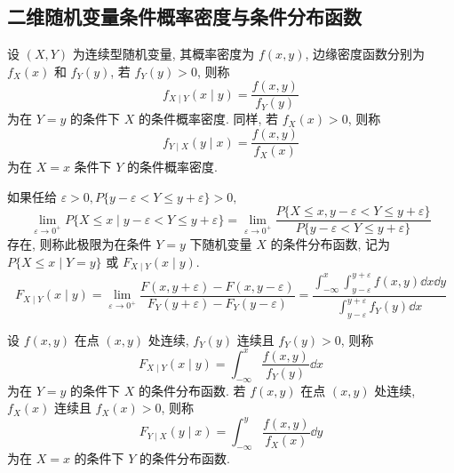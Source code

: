 \subsection{二维随机变量条件概率密度与条件分布函数}

\begin{definition}[二维随机变量条件概率密度]
    设 $ (X, Y) $ 为连续型随机变量, 其概率密度为 $ f(x, y) $, 边缘密度函数分别为 $ f_{X}(x) $ 和 $ f_{Y}(y) $, 
    若 $ f_{Y}(y)>0 $, 则称
    $$f_{X \mid Y}(x \mid y)=\frac{f(x, y)}{f_{Y}(y)}$$
    为在 $ Y=y $ 的条件下 $ X $ 的条件概率密度.
    同样, 若 $ f_{X}(x)>0 $, 则称
    $$f_{Y \mid X}(y \mid x)=\frac{f(x, y)}{f_{X}(x)}$$
    为在 $ X=x $ 条件下 $ Y $ 的条件概率密度.
\end{definition}

\begin{definition}[二维随机变量条件分布函数 A]
    如果任给 $ \varepsilon>0, P\{y-\varepsilon<Y \leqslant y+\varepsilon\}>0 ,$
    $$\lim _{\varepsilon \rightarrow 0^{+}} P\{X \leqslant x \mid y-\varepsilon<Y \leqslant y+\varepsilon\}=\lim _{\varepsilon \rightarrow 0^{+}} \frac{P\{X \leqslant x, y-\varepsilon<Y \leqslant y+\varepsilon\}}{P\{y-\varepsilon<Y \leqslant y+\varepsilon\}}$$
    存在, 则称此极限为在条件 $ Y=y $ 下随机变量 $ X $ 的条件分布函数, 记为 $ P\{X \leqslant x \mid Y=y\} $ 或 $ F_{X \mid Y}(x \mid y) $.
    $$F_{X \mid Y}(x \mid y)=\lim _{\varepsilon \rightarrow 0^{+}} \frac{F(x, y+\varepsilon)-F(x, y-\varepsilon)}{F_{Y}(y+\varepsilon)-F_{Y}(y-\varepsilon)}
    =\frac{\displaystyle\int_{-\infty}^{x} \int_{y-\varepsilon}^{y+\varepsilon} f(x, y) \dd  x \dd  y}{\displaystyle \int_{y-\varepsilon}^{y+\varepsilon} f_{Y}(y) \dd  x}$$
\end{definition}

\begin{definition}[二维随机变量条件分布函数 B]
    设 $ f(x, y) $ 在点 $ (x, y) $ 处连续, $f_{Y}(y) $ 连续且 $ f_{Y}(y)>0 $, 则称
    $$F_{X \mid Y}(x \mid y)=\int_{-\infty}^{x} \frac{f(x, y)}{f_{Y}(y)} \dd  x$$
    为在 $ Y=y $ 的条件下 $ X $ 的条件分布函数.
    若 $ f(x, y) $ 在点 $ (x, y) $ 处连续, $f_{X}(x) $ 连续且 $ f_{X}(x)>0 $, 则称
    $$F_{Y \mid X}(y \mid x)=\int_{-\infty}^{y} \frac{f(x, y)}{f_{X}(x)} \dd  y$$
    为在 $ X=x $ 的条件下 $ Y $ 的条件分布函数.
\end{definition}

